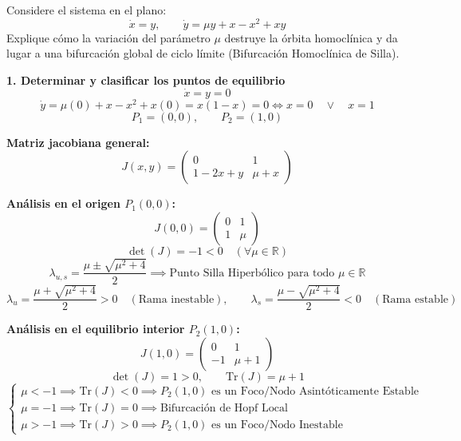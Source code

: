 \documentclass[11pt,a4paper]{article}
\newenvironment{solucion}[1][Solución Detallada]{%
    \vspace{1.5mm}%
    \noindent{\large\textbf{Solución:}}\par\vspace{1.5mm}%
}{%
    \par\vspace{3mm}%
}
\begin{document}
\vspace{3mm}

\begin{problema}[Problema 3.5]
Considere el sistema en el plano:
\[
\dot{x} = y, \qquad \dot{y} = \mu y + x - x^2 + x y
\]
Explique cómo la variación del parámetro $\mu$ destruye la órbita homoclínica y da lugar a una bifurcación global de ciclo límite (Bifurcación Homoclínica de Silla).
\end{problema}

\begin{solucion}

\textbf{\large 1. Determinar y clasificar los puntos de equilibrio}
\[
\dot{x} = y = 0
\]
\[
\dot{y} = \mu(0) + x - x^2 + x(0) = x(1 - x) = 0 \iff x = 0 \quad \lor \quad x = 1
\]
\[
\boxed{P_1 = (0, 0), \qquad P_2 = (1, 0)}
\]

\textbf{Matriz jacobiana general:}
\[
J(x, y) = \begin{pmatrix} 0 & 1 \\ 1 - 2x + y & \mu + x \end{pmatrix}
\]

\textbf{Análisis en el origen $P_1(0, 0)$:}
\[
J(0, 0) = \begin{pmatrix} 0 & 1 \\ 1 & \mu \end{pmatrix}
\]
\[
\det(J) = -1 < 0 \quad (\forall \mu \in \mathbb{R})
\]
\[
\boxed{\lambda_{u, s} = \frac{\mu \pm \sqrt{\mu^2 + 4}}{2} \implies \text{Punto Silla Hiperbólico para todo } \mu \in \mathbb{R}}
\]
\[
\lambda_u = \frac{\mu + \sqrt{\mu^2 + 4}}{2} > 0 \quad (\text{Rama inestable}), \qquad \lambda_s = \frac{\mu - \sqrt{\mu^2 + 4}}{2} < 0 \quad (\text{Rama estable})
\]

\textbf{Análisis en el equilibrio interior $P_2(1, 0)$:}
\[
J(1, 0) = \begin{pmatrix} 0 & 1 \\ -1 & \mu + 1 \end{pmatrix}
\]
\[
\det(J) = 1 > 0, \qquad \mathrm{Tr}(J) = \mu + 1
\]
\[
\begin{cases}
\mu < -1 \implies \mathrm{Tr}(J) < 0 \implies \boxed{P_2(1, 0) \text{ es un Foco/Nodo Asintóticamente Estable}} \\
\mu = -1 \implies \mathrm{Tr}(J) = 0 \implies \boxed{\text{Bifurcación de Hopf Local}} \\
\mu > -1 \implies \mathrm{Tr}(J) > 0 \implies \boxed{P_2(1, 0) \text{ es un Foco/Nodo Inestable}}
\end{cases}
\]


\end{solucion}
\end{document}
